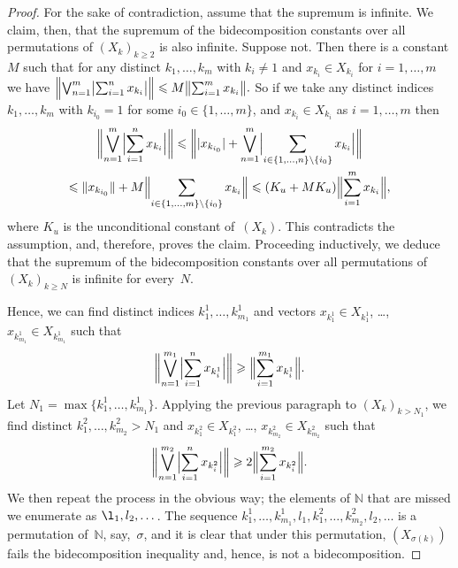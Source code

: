 \documentclass[12pt]{amsart}
\theoremstyle{plain}
\theoremstyle{definition}
\newcommand{\abs}[1]{\lvert#1\rvert}
\newcommand{\norm}[1]{\lVert#1\rVert}
\newcommand{\bigabs}[1]{\bigl\lvert#1\bigr\rvert}
\newcommand{\bignorm}[1]{\bigl\lVert#1\bigr\rVert}
\newcommand{\Bigabs}[1]{\Bigl\lvert#1\Bigr\rvert}
\newcommand{\Bignorm}[1]{\Bigl\lVert#1\Bigr\rVert}
\newcommand{\biggnorm}[1]{\biggl\lVert#1\biggr\rVert}
\renewcommand{\le}{\leqslant}
\renewcommand{\ge}{\geqslant}
\begin{document}
\begin{proof}
  For the sake of contradiction, assume that the supremum is
  infinite. We claim, then, that the supremum of the bidecomposition
  constants over all permutations of $(X_k)_{k\ge 2}$ is also
  infinite. Suppose not.  Then there is a constant $M$ such that for
  any distinct $k_1,\dots,k_m$ with $k_i\ne 1$ and
  $x_{k_i}\in X_{k_i}$ for $i=1,\dots,m$ we have
  \begin{math}
    \Bignorm{\bigvee_{n=1}^m\bigabs{\sum_{i=1}^n x_{k_i}}}
      \le M\bignorm{\sum_{i=1}^mx_{k_i}}.
  \end{math}
  So if we take any distinct indices $k_1,\dots,k_m$ with $k_{i_0}=1$
  for some $i_0\in \{1,\dots,m\}$, and $x_{k_i}\in X_{k_i}$ as
  $i=1,\dots,m$ then
  \begin{multline*}
    \biggnorm{\bigvee_{n=1}^m\Bigabs{\sum_{i=1}^n x_{k_i}}}
    \le\biggnorm{\abs{x_{k_{i_0}}}+\bigvee_{n=1}^m
       \Bigabs{\sum_{i\in \{1,\dots,n\}\setminus \{i_0\}} x_{k_i}}}\\
    \le\norm{x_{k_{i_0}}}+M\Bignorm{\sum_{i\in\{1,\dots,m\}\setminus \{i_0\}}x_{k_i}}
    \le (K_u+MK_u)\Bignorm{\sum_{i=1}^mx_{k_i}},
  \end{multline*}
  where $K_u$ is the unconditional constant of~$(X_k)$. This
  contradicts the assumption, and, therefore, proves the claim.
  Proceeding inductively, we deduce that the supremum of the bidecomposition
  constants over all permutations of $(X_k)_{k\ge N}$ is infinite for
  every~$N$.

  Hence, we can find distinct indices
  $k^1_1,\dots,k^1_{m_1}$ and vectors $x_{k^1_1}\in X_{k^1_1}$, \dots,
  $x_{k^1_{m_1}}\in X_{k^1_{m_1}}$ such that
  \begin{displaymath}
    \biggnorm{\bigvee_{n=1}^{m_1}\Bigabs{\sum_{i=1}^n x_{k^1_i}}}
    \ge\Bignorm{\sum_{i=1}^{m_1}x_{k^1_i}}.
  \end{displaymath}
  Let $N_1=\max\{k^1_1,\dots,k^1_{m_1}\}$. Applying the previous
  paragraph to $(X_k)_{k>N_1}$, we find distinct
  $k^2_1,\dots,k^2_{m_2}>N_1$ and $x_{k^2_1}\in X_{k^2_1}$, \dots,
  $x_{k^2_{m_2}}\in X_{k^2_{m_2}}$ such that
  \begin{displaymath}
    \biggnorm{\bigvee_{n=1}^{m_2}\Bigabs{\sum_{i=1}^n x_{k^2_i}}}
    \ge 2\Bignorm{\sum_{i=1}^{m_2}x_{k^2_i}}.
  \end{displaymath}
  We then repeat the process in the obvious way; the elements of
  $\mathbb N$ that are missed we enumerate as
  $\l_1,l_2,\dots$. The sequence
  $k^1_1,\dots,k^1_{m_1},l_1,k^2_1,\dots,k^2_{m_2},l_2,\dots$ is a
  permutation of~$\mathbb N$, say,~$\sigma$, and it is clear that
  under this permutation, $(X_{\sigma(k)})$ fails the bidecomposition
  inequality and, hence, is not a bidecomposition.
\end{proof}
\end{document}
